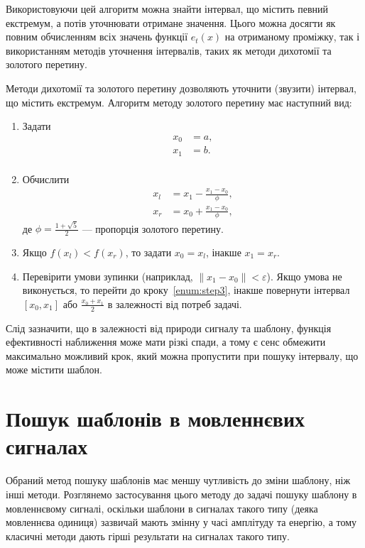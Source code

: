         Використовуючи цей алгоритм можна знайти інтервал, що містить певний екстремум, а потів уточнювати отримане
        значення.
        Цього можна досягти як повним обчисленням всіх значень функції $e_t(x)$ на отриманому проміжку, так і
        використанням методів уточнення інтервалів, таких як методи дихотомії та золотого перетину.

        Методи дихотомії та золотого перетину дозволяють уточнити (звузити) інтервал, що містить екстремум.
        Алгоритм методу золотого перетину має наступний вид:
        \begin{enumerate}
            \item Задати
                \begin{align*}
                    x_0 &= a,\\
                    x_1 &= b.\\
                \end{align*}
            \item Обчислити
                \begin{align*}
                    x_l &= x_1 - \frac{x_1 - x_0}{\phi},\\
                    x_r &= x_0 + \frac{x_1 - x_0}{\phi},
                \end{align*}
                де $\phi = \frac{1 + \sqrt{ 5 }}{2}$ --- пропорція золотого перетину.
            \item\label{enum:step3} Якщо $f(x_l) < f(x_r)$, то задати $x_0 = x_l$, інакше $x_1 = x_r$.
            \item Перевірити умови зупинки (наприклад, $\|x_1 - x_0\| < \varepsilon$).
                Якщо умова не виконується, то перейти до кроку~\ref{enum:step3}, інакше повернути інтервал ${[x_0,
                    x_1]}$ або $\frac{x_0+x_1}{2}$ в залежності від потреб задачі.
        \end{enumerate}

        Слід зазначити, що в залежності від природи сигналу та шаблону, функція ефективності наближення може мати
        різкі спади, а тому є сенс обмежити максимально можливий крок, який можна пропустити при пошуку інтервалу, що
        може містити шаблон.
\section{Пошук шаблонів в мовленнєвих сигналах}
    Обраний метод пошуку шаблонів має меншу чутливість до зміни шаблону, ніж інші методи.
    Розглянемо застосування цього методу до задачі пошуку шаблону в мовленнєвому сигналі, оскільки шаблони в сигналах
    такого типу (деяка мовленнєва одиниця) зазвичай мають змінну у часі амплітуду та енергію, а тому класичні методи
    дають гірші результати на сигналах такого типу.

